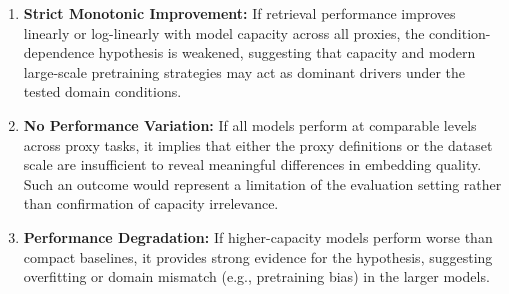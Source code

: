 \begin{enumerate}
    \item \textbf{Strict Monotonic Improvement:} If retrieval performance improves linearly or log-linearly with model capacity across all proxies, the condition-dependence hypothesis is weakened, suggesting that capacity and modern large-scale pretraining strategies may act as dominant drivers under the tested domain conditions.
    \item \textbf{No Performance Variation:} If all models perform at comparable levels across proxy tasks, it implies that either the proxy definitions or the dataset scale are insufficient to reveal meaningful differences in embedding quality. Such an outcome would represent a limitation of the evaluation setting rather than confirmation of capacity irrelevance.
    \item \textbf{Performance Degradation:} If higher-capacity models perform worse than compact baselines, it provides strong evidence for the hypothesis, suggesting overfitting or domain mismatch (e.g., pretraining bias) in the larger models.
\end{enumerate}
